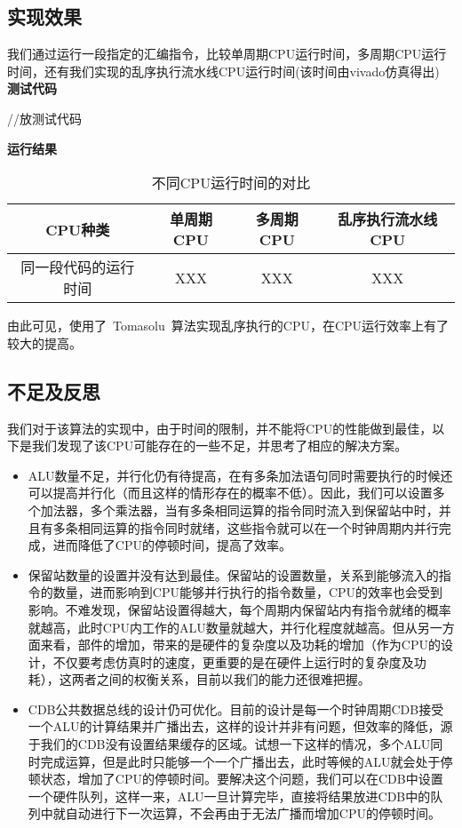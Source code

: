\documentclass[twoside]{article}
\begin{document}
\subsection{实现效果}
我们通过运行一段指定的汇编指令，比较单周期CPU运行时间，多周期CPU运行时间，还有我们实现的乱序执行流水线CPU运行时间(该时间由vivado仿真得出)\\
\textbf{测试代码}
\begin{verilogcode}
//放测试代码
\end{verilogcode}
\textbf{运行结果}
\begin{table}[htp]
    \caption{不同CPU运行时间的对比}
    \centering
    \begin{tabular}{cccc}
        \toprule
        CPU种类 & 单周期CPU & 多周期CPU & 乱序执行流水线CPU \\ 
        \midrule
        同一段代码的运行时间 & XXX & XXX & XXX \\
        \bottomrule
    \end{tabular}
    \label{tab:timediff}    
\end{table}
由此可见，使用了~Tomasolu~算法实现乱序执行的CPU，在CPU运行效率上有了较大的提高。
\subsection{不足及反思}
我们对于该算法的实现中，由于时间的限制，并不能将CPU的性能做到最佳，以下是我们发现了该CPU可能存在的一些不足，并思考了相应的解决方案。
\begin{itemize}
    \item ALU数量不足，并行化仍有待提高，在有多条加法语句同时需要执行的时候还可以提高并行化（而且这样的情形存在的概率不低）。因此，我们可以设置多个加法器，多个乘法器，当有多条相同运算的指令同时流入到保留站中时，并且有多条相同运算的指令同时就绪，这些指令就可以在一个时钟周期内并行完成，进而降低了CPU的停顿时间，提高了效率。
    \item 保留站数量的设置并没有达到最佳。保留站的设置数量，关系到能够流入的指令的数量，进而影响到CPU能够并行执行的指令数量，CPU的效率也会受到影响。不难发现，保留站设置得越大，每个周期内保留站内有指令就绪的概率就越高，此时CPU内工作的ALU数量就越大，并行化程度就越高。但从另一方面来看，部件的增加，带来的是硬件的复杂度以及功耗的增加（作为CPU的设计，不仅要考虑仿真时的速度，更重要的是在硬件上运行时的复杂度及功耗），这两者之间的权衡关系，目前以我们的能力还很难把握。
    \item CDB公共数据总线的设计仍可优化。目前的设计是每一个时钟周期CDB接受一个ALU的计算结果并广播出去，这样的设计并非有问题，但效率的降低，源于我们的CDB没有设置结果缓存的区域。试想一下这样的情况，多个ALU同时完成运算，但是此时只能够一个一个广播出去，此时等候的ALU就会处于停顿状态，增加了CPU的停顿时间。要解决这个问题，我们可以在CDB中设置一个硬件队列，这样一来，ALU一旦计算完毕，直接将结果放进CDB中的队列中就自动进行下一次运算，不会再由于无法广播而增加CPU的停顿时间。
\end{itemize}
\end{document}

